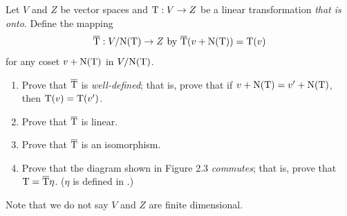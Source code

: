 \begin{exercise} \label{exercise 2.4.24}
Let \(V\) and \(Z\) be vector spaces and \(\mathrm{T} : V \to Z\) be a linear transformation \emph{that is onto}.
Define the mapping
\[
    \overline{\mathrm{T}} : V / \mathrm{N(T)} \to Z \text{ by } \overline{\mathrm{T}}(v + \mathrm{N(T)}) = \mathrm{T}(v)
\]
for any coset \(v + \mathrm{N(T)}\) in \(V / \mathrm{N(T)}\).
\begin{enumerate}
\item Prove that \(\overline{\mathrm{T}}\) is \emph{well-defined};
    that is, prove that if \(v + \mathrm{N(T)} = v' + \mathrm{N(T)}\), then \(\mathrm{T}(v) = \mathrm{T}(v')\).
\item Prove that \(\overline{\mathrm{T}}\) is linear.
\item Prove that \(\overline{\mathrm{T}}\) is an isomorphism.
\item Prove that the diagram shown in Figure 2.3 \emph{commutes};
    that is, prove that \(\mathrm{T} = \overline{\mathrm{T}} \eta\). (\(\eta\) is defined in .)
\end{enumerate}

Note that we do not say \(V\) and \(Z\) are finite dimensional.
\end{exercise}

